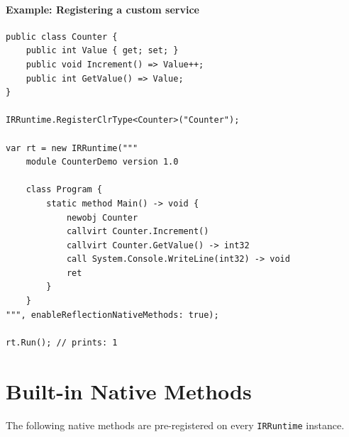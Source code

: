 \documentclass[11pt,a4paper]{article}
\begin{document}
\paragraph{Example: Registering a custom service}
\begin{lstlisting}[language={[Sharp]C}]
public class Counter {
    public int Value { get; set; }
    public void Increment() => Value++;
    public int GetValue() => Value;
}

IRRuntime.RegisterClrType<Counter>("Counter");

var rt = new IRRuntime("""
    module CounterDemo version 1.0

    class Program {
        static method Main() -> void {
            newobj Counter
            callvirt Counter.Increment()
            callvirt Counter.GetValue() -> int32
            call System.Console.WriteLine(int32) -> void
            ret
        }
    }
""", enableReflectionNativeMethods: true);

rt.Run(); // prints: 1
\end{lstlisting}

\section{Built-in Native Methods}

The following native methods are pre-registered on every \texttt{IRRuntime}
instance.
\end{document}
